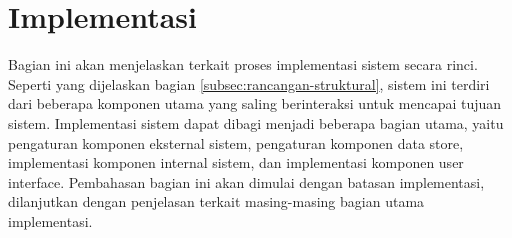 \section{Implementasi}



Bagian ini akan menjelaskan terkait proses implementasi sistem secara rinci. Seperti yang dijelaskan bagian \ref{subsec:rancangan-struktural}, sistem ini terdiri dari beberapa komponen utama yang saling berinteraksi untuk mencapai tujuan sistem. Implementasi sistem dapat dibagi menjadi beberapa bagian utama, yaitu pengaturan komponen eksternal sistem, pengaturan komponen data store, implementasi komponen internal sistem, dan implementasi komponen user interface. Pembahasan bagian ini akan dimulai dengan batasan implementasi, dilanjutkan dengan penjelasan terkait masing-masing bagian utama implementasi.

\subsection{}